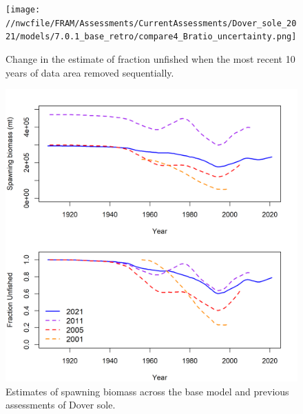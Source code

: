 \documentclass[11pt,
  english,
  a4paper,
]{article}
\begin{document}
\tagmcend\tagstructend


\begin{figure}
\centering
\texttt{[image: //nwcfile/FRAM/Assessments/CurrentAssessments/Dover\_sole\_2021/models/7.0.1\_base\_retro/compare4\_Bratio\_uncertainty.png]}
\caption{Change in the estimate of fraction unfished when the most recent 10 years of data area removed sequentially.\label{fig:retro-depl}}
\end{figure}

\tagmcend\tagstructend


\begin{figure}
\centering
\includegraphics[width=1\textwidth,height=1\textheight]{figs/assessment_history.png}
\caption{Estimates of spawning biomass across the base model and previous assessments of Dover sole.\label{fig:past-assess}}
\end{figure}

\tagmcend\tagstructend
\end{document}
